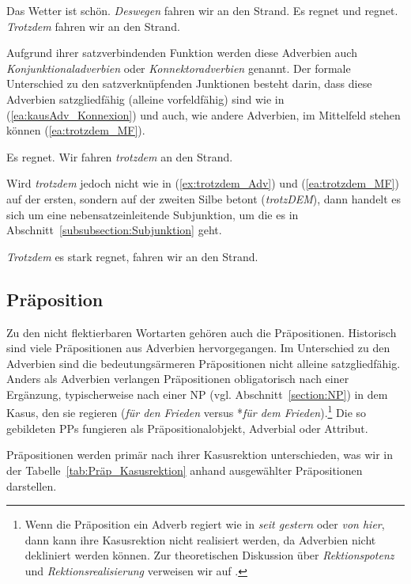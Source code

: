 \ea \label{ea:kausAdv_Konnexion}
\ea \label{ea:darum_Adv} Das Wetter ist schön. \textit{Deswegen} fahren wir an den Strand.
\ex \label{ex:trotzdem_Adv} Es regnet und regnet. \textit{Trotzdem} fahren wir an den Strand.
\z 
\z 

Aufgrund ihrer satzverbindenden Funktion werden diese Adverbien auch \textit{Konjunktionaladverbien} oder \textit{Konnektoradverbien} genannt. Der formale Unterschied zu den satzverknüpfenden Junktionen besteht darin, dass diese Adverbien satzgliedfähig (alleine vorfeldfähig) sind wie in (\ref{ea:kausAdv_Konnexion}) und auch, wie andere Adverbien, im Mittelfeld stehen können (\ref{ea:trotzdem_MF}). 

\ea \label{ea:trotzdem_MF} Es regnet. Wir fahren \textit{trotzdem} an den Strand.
\z 

Wird \textit{trotzdem} jedoch nicht wie in (\ref{ex:trotzdem_Adv}) und (\ref{ea:trotzdem_MF}) auf der ersten, sondern auf der zweiten Silbe betont (\textit{trotzDEM}), dann handelt es sich um eine nebensatzeinleitende Subjunktion, um die es in Abschnitt~\ref{subsubsection:Subjunktion} geht.

\ea \label{ea:trodzDEM_Subjunktion} \textit{Trotzdem} es stark regnet, fahren wir an den Strand.
\z 


\subsection{Präposition}\label{subsection:Präposition}

Zu den nicht flektierbaren Wortarten gehören auch die Präpositionen. Historisch sind viele Präpositionen aus Adverbien hervorgegangen. Im Unterschied zu den Adverbien sind die bedeutungsärmeren Präpositionen nicht alleine satzgliedfähig. Anders als Adverbien verlangen Präpositionen obligatorisch nach einer Ergänzung, typischerweise nach einer NP (vgl. Abschnitt~\ref{section:NP}) in dem Kasus, den sie regieren (\textit{für den Frieden} versus *\textit{für dem Frieden}).\footnote{Wenn die Präposition ein Adverb regiert wie in \textit{seit gestern} oder \textit{von hier}, dann kann ihre Kasusrektion nicht realisiert werden, da Adverbien nicht dekliniert werden können. Zur theoretischen Diskussion über \textit{Rektionspotenz} und \textit{Rektionsrealisierung} verweisen wir auf \citet[59, 63, 68]{Agel2000}.} Die so gebildeten PPs fungieren als Präpositionalobjekt, Adverbial oder Attribut.

Präpositionen werden primär nach ihrer Kasusrektion unterschieden, was wir in der Tabelle~\ref{tab:Präp_Kasusrektion} anhand ausgewählter Präpositionen darstellen.

